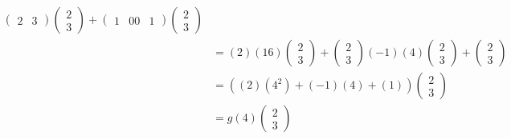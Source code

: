 \begin{enumerate}
\begin{align}
\begin{pmatrix}
2 & 3
\end{pmatrix}\begin{pmatrix}2\\3\end{pmatrix}
+
\begin{pmatrix}
1 & 0
0 & 1
\end{pmatrix}\begin{pmatrix}2\\3\end{pmatrix}\\
&=
(2)(16)\begin{pmatrix}2\\3\end{pmatrix} +\begin{pmatrix}2\\3\end{pmatrix}
(-1)(4)\begin{pmatrix}2\\3\end{pmatrix}
+ \begin{pmatrix}2\\3\end{pmatrix}\\
&= \left((2)(4^2)+(-1)(4)+(1)\right)\begin{pmatrix}2\\3\end{pmatrix}\\
&= g(4)\begin{pmatrix}2\\3\end{pmatrix}
\end{align}
\end{enumerate}
